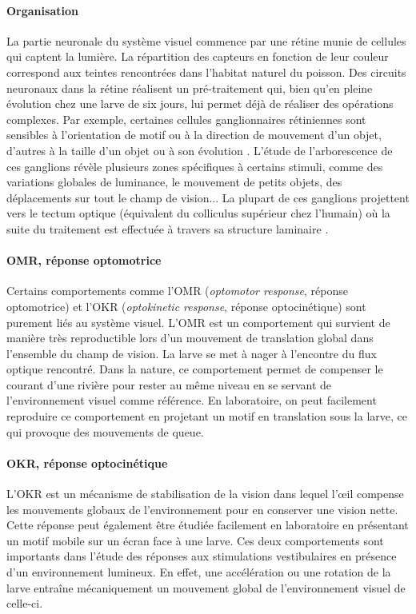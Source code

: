 \paragraph{Organisation}
La partie neuronale du système visuel commence par une rétine munie de cellules qui captent la lumière. La répartition des capteurs en fonction de leur couleur correspond aux teintes rencontrées dans l'habitat naturel du poisson. Des circuits neuronaux dans la rétine réalisent un pré-traitement qui, bien qu'en pleine évolution chez une larve de six jours, lui permet déjà de réaliser des opérations complexes. Par exemple, certaines cellules ganglionnaires rétiniennes sont sensibles à l'orientation de motif ou à la direction de mouvement d'un objet, d'autres à la taille d'un objet ou à son évolution \cite{bollmann_zebrafish_2019}. L'étude de l'arborescence de ces ganglions révèle plusieurs zones spécifiques à certains stimuli, comme des variations globales de luminance, le mouvement de petits objets, des déplacements sur tout le champ de vision... La plupart de ces ganglions projettent vers le tectum optique (équivalent du colliculus supérieur chez l'humain) où la suite du traitement est effectuée à travers sa structure laminaire \cite{portugues_neural_2009}.

\paragraph{OMR, réponse optomotrice}
Certains comportements comme l'OMR (\emph{optomotor response}, réponse optomotrice) et l'OKR (\emph{optokinetic response}, réponse optocinétique) sont purement liés au système visuel. L'OMR est un comportement qui survient de manière très reproductible lors d'un mouvement de translation global dans l'ensemble du champ de vision. La larve se met à nager à l'encontre du flux optique rencontré. Dans la nature, ce comportement permet de compenser le courant d'une rivière pour rester au même niveau en se servant de l'environnement visuel comme référence. En laboratoire, on peut facilement reproduire ce comportement en projetant un motif en translation sous la larve, ce qui provoque des mouvements de queue.

\paragraph{OKR, réponse optocinétique}
L'OKR est un mécanisme de stabilisation de la vision dans lequel l’œil compense les mouvements globaux de l'environnement pour en conserver une vision nette. Cette réponse peut également être étudiée facilement en laboratoire en présentant un motif mobile sur un écran face à une larve. Ces deux comportements sont importants dans l'étude des réponses aux stimulations vestibulaires en présence d'un environnement lumineux. En effet, une accélération ou une rotation de la larve entraîne mécaniquement un mouvement global de l'environnement visuel de celle-ci.

